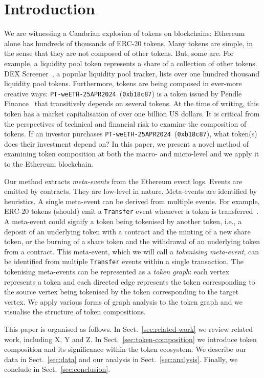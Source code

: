 \section{Introduction}\label{sec:introduction}

We are witnessing a Cambrian explosion of tokens on blockchains:
Ethereum alone has hundreds of thousands of ERC-20 tokens.  Many
tokens are simple, in the sense that they are not composed of other
tokens.  But, some are.  For example, a liquidity pool token
represents a share of a collection of other tokens.  DEX
Screener~\cite{dex-screener-xx}, a popular liquidity pool tracker,
lists over one hundred thousand liquidity pool tokens.  Furthermore,
tokens are being composed in ever-more creative ways:
\texttt{PT-weETH-25APR2024}~(\texttt{0xb18c87}) is a token issued by
Pendle Finance~\cite{pendle-finance-xx} that transitively depends on
several tokens.  At the time of writing, this token has a market
capitalisation of over one billion US dollars.  It is critical from
the perspectives of technical and financial risk to examine the
composition of tokens.  If an investor purchases
\texttt{PT-weETH-25APR2024}~(\texttt{0xb18c87}), what token(s) does
their investment depend on?  In this paper, we present a novel method
of examining token composition at both the macro- and micro-level and
we apply it to the Ethereum blockchain.

Our method extracts \textit{meta-events} from the Ethereum event logs.
Events are emitted by contracts.  They are low-level in nature.
Meta-events are identified by heuristics.  A single meta-event can be
derived from multiple events.  For example, ERC-20 tokens (should)
emit a \texttt{Transfer} event whenever a token is
transferred~\cite{vogelsteller-buterin-15}.  A meta-event could
signify a token being tokenised by another token, i.e., a deposit of
an underlying token with a contract and the minting of a new share
token, or the burning of a share token and the withdrawal of an
underlying token from a contract.  This meta-event, which we will call
a \textit{tokenising meta-event}, can be identified from multiple
\texttt{Transfer} events within a single transaction.  The tokenising
meta-events can be represented as a \textit{token graph}: each vertex
represents a token and each directed edge represents the token
corresponding to the source vertex being tokenised by the token
corresponding to the target vertex.  We apply various forms of graph
analysis to the token graph and we visualise the structure of token
compositions.

This paper is organised as follows.  In Sect.~\ref{sec:related-work}
we review related work, including X, Y and Z.  In
Sect.~\ref{sec:token-composition} we introduce token composition and
its significance within the token ecosystem.  We describe our data in
Sect.~\ref{sec:data} and our analysis in Sect.~\ref{sec:analysis}.
Finally, we conclude in Sect.~\ref{sec:conclusion}.
